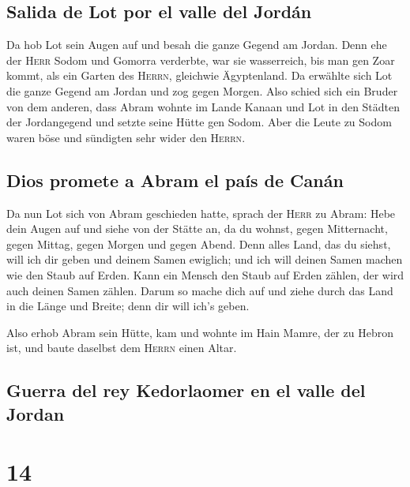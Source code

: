 \hypertarget{salida-de-lot-por-el-valle-del-jorduxe1n}{%
\subsection{Salida de Lot por el valle del
Jordán}\label{salida-de-lot-por-el-valle-del-jorduxe1n}}

 Da hob Lot sein Augen auf und besah die ganze Gegend am
Jordan. Denn ehe der \textsc{Herr} Sodom und Gomorra verderbte, war sie
wasserreich, bis man gen Zoar kommt, als ein Garten des \textsc{Herrn},
gleichwie Ägyptenland.  Da erwählte sich Lot die ganze
Gegend am Jordan und zog gegen Morgen. Also schied sich ein Bruder von
dem anderen,  dass Abram wohnte im Lande Kanaan und Lot
in den Städten der Jordangegend und setzte seine Hütte gen Sodom.
 Aber die Leute zu Sodom waren böse und sündigten sehr
wider den \textsc{Herrn}.

\hypertarget{dios-promete-a-abram-el-pauxeds-de-canuxe1n}{%
\subsection{Dios promete a Abram el país de
Canán}\label{dios-promete-a-abram-el-pauxeds-de-canuxe1n}}

 Da nun Lot sich von Abram geschieden hatte, sprach der
\textsc{Herr} zu Abram: Hebe dein Augen auf und siehe von der Stätte an,
da du wohnst, gegen Mitternacht, gegen Mittag, gegen Morgen und gegen
Abend.  Denn alles Land, das du siehst, will ich dir
geben und deinem Samen ewiglich;  und ich will deinen
Samen machen wie den Staub auf Erden. Kann ein Mensch den Staub auf
Erden zählen, der wird auch deinen Samen zählen.  Darum
so mache dich auf und ziehe durch das Land in die Länge und Breite; denn
dir will ich's geben.

 Also erhob Abram sein Hütte, kam und wohnte im Hain
Mamre, der zu Hebron ist, und baute daselbst dem \textsc{Herrn} einen
Altar.

\hypertarget{guerra-del-rey-kedorlaomer-en-el-valle-del-jordan}{%
\subsection{Guerra del rey Kedorlaomer en el valle del
Jordan}\label{guerra-del-rey-kedorlaomer-en-el-valle-del-jordan}}

\hypertarget{section-13}{%
\section{14}\label{section-13}}

